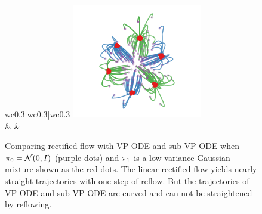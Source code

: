 \begin{figure}[h]
\begin{tabular}{wc{0.3\textwidth}|wc{0.3\textwidth}|wc{0.3\textwidth}}
    \hspace{-2em}\includegraphics[width=.2\textwidth]{arxiv_figures/stdGauss_cycle2_6_sub_vpsde_rect_1_steps.png}  
\\
{\scriptsize {}} \hfill
  {\scriptsize {}} 
& {\scriptsize {}} \hfill
 {\scriptsize {}} 
& {\scriptsize {}} \hfill
 {\scriptsize {}} 
\end{tabular}
\caption{
Comparing rectified flow with VP ODE and sub-VP ODE when ${\pi}_0 = \mathcal{N}(0,I)$ (purple dots) and ${\pi}_1$ is a low variance Gaussian mixture shown as the red dots. 
The linear rectified flow yields nearly straight trajectories with one step of reflow. But the trajectories of VP ODE and sub-VP ODE are curved and can not be straightened by reflowing. 
} 
\label{fig:gauss2dots}
\end{figure}


